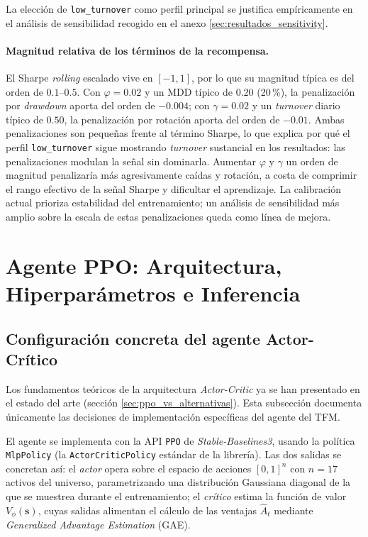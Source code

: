 \documentclass[IB,a4paper]{TFUOC}
\begin{document}
La elección de \texttt{low\_turnover} como perfil principal se justifica empíricamente en el análisis de sensibilidad recogido en el anexo \ref{sec:resultados_sensitivity}.

\paragraph{Magnitud relativa de los términos de la recompensa.} El Sharpe \textit{rolling} escalado vive en $[-1, 1]$, por lo que su magnitud típica es del orden de $0.1$--$0.5$. Con $\varphi = 0.02$ y un MDD típico de $0.20$ (20\,\%), la penalización por \textit{drawdown} aporta del orden de $-0.004$; con $\gamma = 0.02$ y un \textit{turnover} diario típico de $0.50$, la penalización por rotación aporta del orden de $-0.01$. Ambas penalizaciones son pequeñas frente al término Sharpe, lo que explica por qué el perfil \texttt{low\_turnover} sigue mostrando \textit{turnover} sustancial en los resultados: las penalizaciones modulan la señal sin dominarla. Aumentar $\varphi$ y $\gamma$ un orden de magnitud penalizaría más agresivamente caídas y rotación, a costa de comprimir el rango efectivo de la señal Sharpe y dificultar el aprendizaje. La calibración actual prioriza estabilidad del entrenamiento; un análisis de sensibilidad más amplio sobre la escala de estas penalizaciones queda como línea de mejora.

\section{Agente PPO: Arquitectura, Hiperparámetros e Inferencia}
\label{sec:agente_ppo}

\subsection{Configuración concreta del agente Actor-Crítico}

Los fundamentos teóricos de la arquitectura \textit{Actor-Critic} ya se han presentado en el estado del arte (sección \ref{sec:ppo_vs_alternativas}). Esta subsección documenta únicamente las decisiones de implementación específicas del agente del TFM.

El agente se implementa con la API \texttt{PPO} de \textit{Stable-Baselines3}, usando la política \texttt{MlpPolicy} (la \texttt{ActorCriticPolicy} estándar de la librería). Las dos salidas se concretan así: el \textit{actor} opera sobre el espacio de acciones $[0,1]^{n}$ con $n=17$ activos del universo, parametrizando una distribución Gaussiana diagonal de la que se muestrea durante el entrenamiento; el \textit{crítico} estima la función de valor $V_{\phi}(\mathbf{s})$, cuyas salidas alimentan el cálculo de las ventajas $\hat{A}_t$ mediante \textit{Generalized Advantage Estimation} (GAE).
\end{document}
